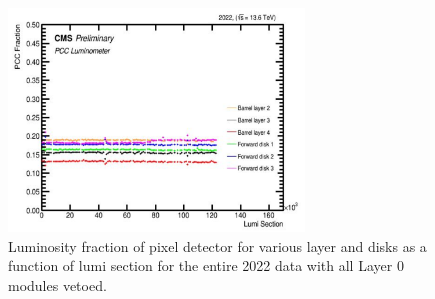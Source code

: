   
\begin{figure}[!htp]
  \centering
  \includegraphics[width=0.7\textwidth]{ashish_thesis/PCC_stability_2022_L0veto_4.png}
  \caption[Luminosity Fractions w/o Layer 0 Modules]{Luminosity fraction of pixel detector for various layer and disks as a function of lumi section for the entire 2022 data with all Layer 0 modules vetoed.}
  \label{fig:stabprof_69a}
\end{figure}


